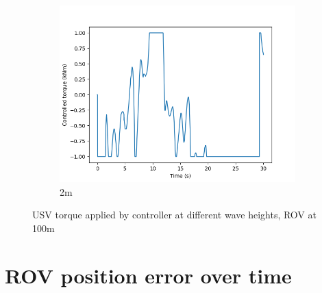 \documentclass[class=article, crop=false]{standalone}
\begin{document}
\begin{figure}
\begin{subfigure}[b]{0.48\textwidth}
        \includegraphics{scenario1/rov-100m/2.0m/usv_torque}
        \caption{2m}
        \label{}
    \end{subfigure}

    \caption{USV torque applied by controller at different wave heights, ROV at 100m}
\end{figure}

\FloatBarrier
\section{ROV position error over time}
\end{document}
